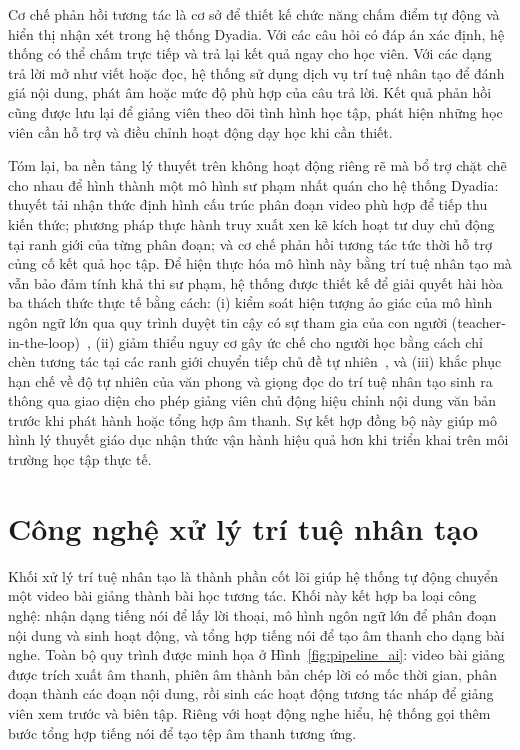 \documentclass[../DoAn.tex]{subfiles}
\begin{document}
Cơ chế phản hồi tương tác là cơ sở để thiết kế chức năng chấm điểm tự động và hiển thị nhận xét trong hệ thống Dyadia. Với các câu hỏi có đáp án xác định, hệ thống có thể chấm trực tiếp và trả lại kết quả ngay cho học viên. Với các dạng trả lời mở như viết hoặc đọc, hệ thống sử dụng dịch vụ trí tuệ nhân tạo để đánh giá nội dung, phát âm hoặc mức độ phù hợp của câu trả lời. Kết quả phản hồi cũng được lưu lại để giảng viên theo dõi tình hình học tập, phát hiện những học viên cần hỗ trợ và điều chỉnh hoạt động dạy học khi cần thiết.

Tóm lại, ba nền tảng lý thuyết trên không hoạt động riêng rẽ mà bổ trợ chặt chẽ cho nhau để hình thành một mô hình sư phạm nhất quán cho hệ thống Dyadia: thuyết tải nhận thức định hình cấu trúc phân đoạn video phù hợp để tiếp thu kiến thức; phương pháp thực hành truy xuất xen kẽ kích hoạt tư duy chủ động tại ranh giới của từng phân đoạn; và cơ chế phản hồi tương tác tức thời hỗ trợ củng cố kết quả học tập.
Để hiện thực hóa mô hình này bằng trí tuệ nhân tạo mà vẫn bảo đảm tính khả thi sư phạm, hệ thống được thiết kế để giải quyết hài hòa ba thách thức thực tế bằng cách: (i) kiểm soát hiện tượng ảo giác của mô hình ngôn ngữ lớn qua quy trình duyệt tin cậy có sự tham gia của con người (teacher-in-the-loop)~\cite{alfaraby2024analysis, durgungoz2025exploring}, (ii) giảm thiểu nguy cơ gây ức chế cho người học bằng cách chỉ chèn tương tác tại các ranh giới chuyển tiếp chủ đề tự nhiên~\cite{brame2016effective}, và (iii) khắc phục hạn chế về độ tự nhiên của văn phong và giọng đọc do trí tuệ nhân tạo sinh ra~\cite{xu2024recorded} thông qua giao diện cho phép giảng viên chủ động hiệu chỉnh nội dung văn bản trước khi phát hành hoặc tổng hợp âm thanh. Sự kết hợp đồng bộ này giúp mô hình lý thuyết giáo dục nhận thức vận hành hiệu quả hơn khi triển khai trên môi trường học tập thực tế.


\section{Công nghệ xử lý trí tuệ nhân tạo}
\label{section:3.2}
Khối xử lý trí tuệ nhân tạo là thành phần cốt lõi giúp hệ thống tự động chuyển một video bài giảng thành bài học tương tác. Khối này kết hợp ba loại công nghệ: nhận dạng tiếng nói để lấy lời thoại, mô hình ngôn ngữ lớn để phân đoạn nội dung và sinh hoạt động, và tổng hợp tiếng nói để tạo âm thanh cho dạng bài nghe. Toàn bộ quy trình được minh họa ở Hình~\ref{fig:pipeline_ai}: video bài giảng được trích xuất âm thanh, phiên âm thành bản chép lời có mốc thời gian, phân đoạn thành các đoạn nội dung, rồi sinh các hoạt động tương tác nháp để giảng viên xem trước và biên tập. Riêng với hoạt động nghe hiểu, hệ thống gọi thêm bước tổng hợp tiếng nói để tạo tệp âm thanh tương ứng.
\end{document}
